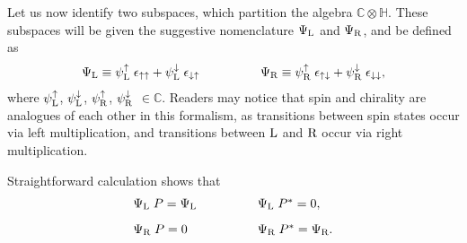 \documentclass[letterpaper,12pt,titlepage,oneside,final]{book}
\newcommand{\CH}{\mathbb{C}\otimes\mathbb{H}}
\begin{document}
Let us now identify two subspaces, which partition the algebra $\CH$.  These subspaces will be given the suggestive nomenclature $\Psi_{\textup{L}}$ and $\Psi_{\textup{R}}$, and be defined as
\begin{equation}\begin{array}{lll}
\Psi_{\textup{L}} \equiv \psi^{\uparrow}_{\textup{L}} \hspace{1mm} \epsilon_{\uparrow \uparrow} +  \psi^{\downarrow}_{\textup{L}} \hspace{1mm} \epsilon_{\downarrow \uparrow}  & \hspace{1cm} &  \Psi_{\textup{R}} \equiv \psi^{\uparrow}_{\textup{R}} \hspace{1mm} \epsilon_{\uparrow \downarrow} +  \psi^{\downarrow}_{\textup{R}} \hspace{1mm} \epsilon_{\downarrow \downarrow},
\end{array}\end{equation}
\noindent where $\psi^{\uparrow}_{\textup{L}}$, $\psi^{\downarrow}_{\textup{L}}$, $\psi^{\uparrow}_{\textup{R}}$, $\psi^{\downarrow}_{\textup{R}}$ $\in \mathbb{C}$.  Readers may notice that spin and chirality are analogues of each other in this formalism, as transitions between spin states occur via left multiplication, and transitions between $\textup{L}$ and $\textup{R}$ occur via right multiplication.

Straightforward calculation shows that  
\begin{equation} \begin{array}{lll}
\Psi_{\textup{L}}\hspace{1mm} P = \Psi_{\textup{L}} & \hspace{1cm} & \Psi_{\textup{L}}\hspace{1mm} P^* = 0,\vspace{3mm}\\
\Psi_{\textup{R}}\hspace{1mm} P = 0 & \hspace{1cm} &   \Psi_{\textup{R}}\hspace{1mm} P^* = \Psi_{\textup{R}}.
\end{array}\end{equation}

\end{document}

